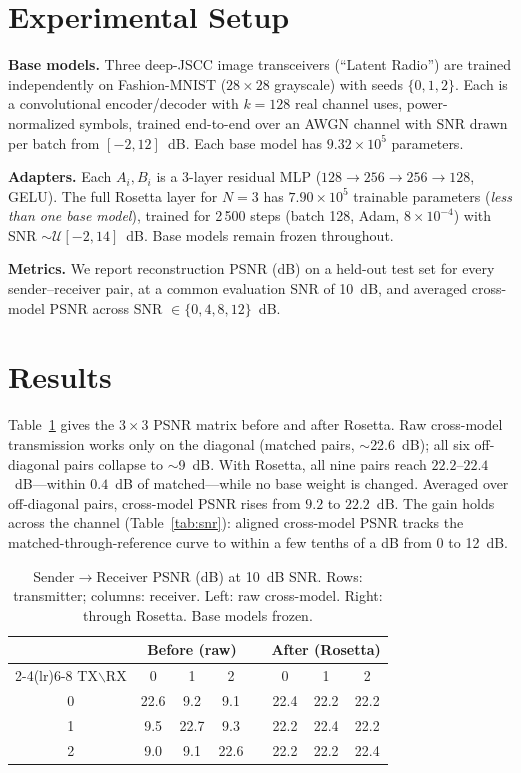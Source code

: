 \documentclass[11pt]{article}
\begin{document}
\section{Experimental Setup}
\textbf{Base models.} Three deep-JSCC image transceivers (``Latent Radio'') are trained
independently on Fashion-MNIST ($28\times28$ grayscale) with seeds $\{0,1,2\}$. Each is
a convolutional encoder/decoder with $k=128$ real channel uses, power-normalized
symbols, trained end-to-end over an AWGN channel with SNR drawn per batch from
$[-2,12]$~dB. Each base model has $9.32\times10^5$ parameters.

\textbf{Adapters.} Each $A_i,B_i$ is a 3-layer residual MLP ($128\!\to\!256\!\to\!256\!
\to\!128$, GELU). The full Rosetta layer for $N=3$ has $7.90\times10^5$ trainable
parameters (\emph{less than one base model}), trained for 2\,500 steps (batch 128, Adam,
$8\times10^{-4}$) with SNR $\sim\mathcal{U}[-2,14]$~dB. Base models remain frozen
throughout.

\textbf{Metrics.} We report reconstruction PSNR (dB) on a held-out test set for every
sender--receiver pair, at a common evaluation SNR of 10~dB, and averaged cross-model
PSNR across SNR $\in\{0,4,8,12\}$~dB.

\section{Results}
Table~\ref{tab:matrix} gives the $3\times3$ PSNR matrix before and after Rosetta.
Raw cross-model transmission works only on the diagonal (matched pairs, $\sim$22.6~dB);
all six off-diagonal pairs collapse to $\sim$9~dB. With Rosetta, all nine pairs reach
$22.2$--$22.4$~dB---within $0.4$~dB of matched---while no base weight is changed.
Averaged over off-diagonal pairs, cross-model PSNR rises from $9.2$ to $22.2$~dB. The
gain holds across the channel (Table~\ref{tab:snr}): aligned cross-model PSNR tracks the
matched-through-reference curve to within a few tenths of a dB from 0 to 12~dB.

\begin{table}[h]
\centering
\caption{Sender$\rightarrow$Receiver PSNR (dB) at 10~dB SNR. Rows: transmitter; columns:
receiver. Left: raw cross-model. Right: through Rosetta. Base models frozen.}
\label{tab:matrix}
\small
\begin{tabular}{c ccc c ccc}
\toprule
& \multicolumn{3}{c}{\textbf{Before (raw)}} & & \multicolumn{3}{c}{\textbf{After (Rosetta)}}\\
\cmidrule(lr){2-4}\cmidrule(lr){6-8}
TX$\backslash$RX & 0 & 1 & 2 & & 0 & 1 & 2\\
\midrule
0 & 22.6 & 9.2 & 9.1 & & 22.4 & 22.2 & 22.2\\
1 & 9.5 & 22.7 & 9.3 & & 22.2 & 22.4 & 22.2\\
2 & 9.0 & 9.1 & 22.6 & & 22.2 & 22.2 & 22.4\\
\bottomrule
\end{tabular}
\end{table}
\end{document}
